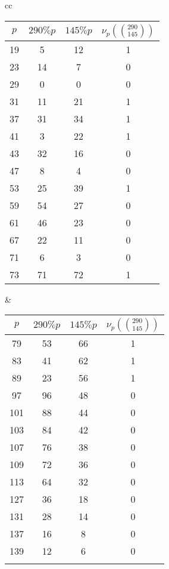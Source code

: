 \documentclass{article}
\begin{document}
\begin{enumerate}[leftmargin=*, label=\arabic*.]
     \begin{center}
     \renewcommand{\arraystretch}{1.5}
    \begin{tabular}{cc}
    \begin{minipage}{0.45\textwidth}
    \begin{tabular}{|c|c|c|c|}
    \hline
    $p$ & $290 \% p$ & $145 \% p$ & $\nu_p\left(\binom{290}{145}\right)$ \\
    \hline
    19 & 5 & 12 & 1 \\
    23 & 14 & 7 & 0 \\
    29 & 0 & 0 & 0 \\
    31 & 11 & 21 & 1 \\
    37 & 31 & 34 & 1 \\
    41 & 3 & 22 & 1 \\
    43 & 32 & 16 & 0 \\
    47 & 8 & 4 & 0 \\
    53 & 25 & 39 & 1 \\
    59 & 54 & 27 & 0 \\
    61 & 46 & 23 & 0 \\
    67 & 22 & 11 & 0 \\
    71 & 6 & 3 & 0 \\
    73 & 71 & 72 & 1 \\
    \hline
    \end{tabular}
    \end{minipage}
    &
    \begin{minipage}{0.45\textwidth}
    \begin{tabular}{|c|c|c|c|}
    \hline
    $p$ & $290 \% p$ & $145 \% p$ & $\nu_p\left(\binom{290}{145}\right)$ \\
    \hline
    79 & 53 & 66 & 1 \\
    83 & 41 & 62 & 1 \\
    89 & 23 & 56 & 1 \\
    97 & 96 & 48 & 0 \\
    101 & 88 & 44 & 0 \\
    103 & 84 & 42 & 0 \\
    107 & 76 & 38 & 0 \\
    109 & 72 & 36 & 0 \\
    113 & 64 & 32 & 0 \\
    127 & 36 & 18 & 0 \\
    131 & 28 & 14 & 0 \\
    137 & 16 & 8 & 0 \\
    139 & 12 & 6 & 0 \\
     &  &  &  \\
    \hline
    \end{tabular}
    \end{minipage}
    \end{tabular}
    \end{center} 


\end{enumerate}
\end{document}
